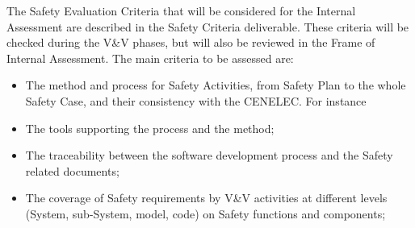 \documentclass{template/openetcs_article}
\begin{document}
The Safety Evaluation Criteria that will be considered for the Internal Assessment are described in the Safety Criteria deliverable. These criteria will be checked during the V\&V phases, but will also be reviewed in the Frame of Internal Assessment.
The main criteria to be assessed are:
\begin{itemize}
\item The method and process for Safety Activities, from Safety Plan to the whole Safety Case, and their consistency with the CENELEC. For instance
\item The tools supporting the process and the method;
\item The traceability between the software development process and the Safety related documents;
\item The coverage of Safety requirements by V\&V activities at different levels (System,  sub-System, model, code) on Safety functions and components;
\end{itemize}
\end{document}
